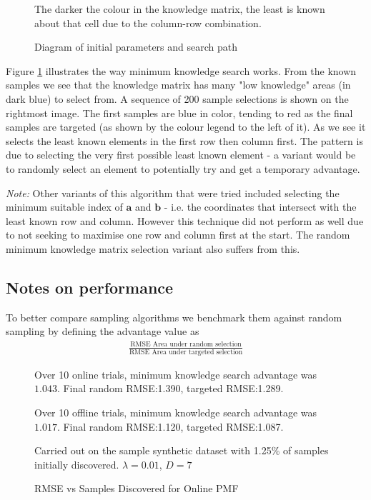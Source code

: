 \begin{figure}[!htbp]
  \begin{center}
    \resizebox{\textwidth}{!}{}
  \end{center}
  The darker the colour in the knowledge matrix, the least is known about that cell due to the column-row combination.
    \caption{Diagram of initial parameters and search path}
    \label{fig:min_know_search}
\end{figure}

Figure \ref{fig:min_know_search} illustrates the way minimum knowledge search works. From the known samples we see that the knowledge matrix has many "low knowledge" areas (in dark blue) to select from. A sequence of 200 sample selections is shown on the rightmost image. The first samples are blue in color, tending to red as the final samples are targeted (as shown by the colour legend to the left of it). As we see it selects the least known elements in the first row then column first. The pattern is due to selecting the very first possible least known element - a variant would be to randomly select an element to potentially try and get a temporary advantage.

\textit{Note:} Other variants of this algorithm that were tried included selecting the minimum suitable index of $\mathbf{a}$ and $\mathbf{b}$ - i.e. the coordinates that intersect with the least known row and column. However this technique did not perform as well due to not seeking to maximise one row and column first at the start. The random minimum knowledge matrix selection variant also suffers from this.


\subsection{Notes on performance}

To better compare sampling algorithms we benchmark them against random sampling by defining the advantage value as 
\begin{align*}
\frac{\text{RMSE Area under random selection}}{\text{RMSE Area under targeted selection}}
\end{align*}


\begin{figure}[!htbp]
  \begin{center}
    \resizebox{\textwidth}{!}{}
  \end{center}
  Over 10 online trials, minimum knowledge search advantage was $1.043$. Final random RMSE:1.390, targeted RMSE:1.289.
  
   Over 10 offline trials, minimum knowledge search advantage was $1.017$. Final random RMSE:1.120, targeted RMSE:1.087. 
    
Carried out on the sample synthetic dataset with 1.25\% of samples initially discovered.  $\lambda = 0.01$, $D=7$
    \caption{RMSE vs Samples Discovered for Online PMF}
    \label{fig:online_pmf_active}
\end{figure}


